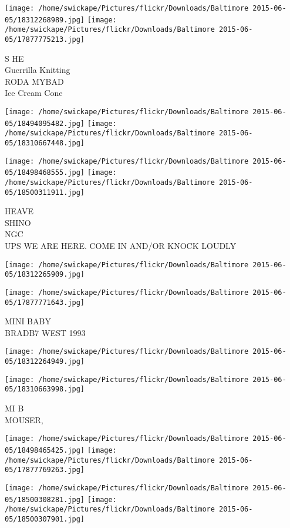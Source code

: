 \documentclass[10pt,letterpaper]{article}
\begin{document}
\texttt{[image: /home/swickape/Pictures/flickr/Downloads/Baltimore 2015-06-05/18312268989.jpg]}
\texttt{[image: /home/swickape/Pictures/flickr/Downloads/Baltimore 2015-06-05/17877775213.jpg]}

S HE\\
Guerrilla Knitting\\
RODA MYBAD\\
Ice Cream Cone
\pagebreak

\texttt{[image: /home/swickape/Pictures/flickr/Downloads/Baltimore 2015-06-05/18494095482.jpg]}
\texttt{[image: /home/swickape/Pictures/flickr/Downloads/Baltimore 2015-06-05/18310667448.jpg]}

\texttt{[image: /home/swickape/Pictures/flickr/Downloads/Baltimore 2015-06-05/18498468555.jpg]}
\texttt{[image: /home/swickape/Pictures/flickr/Downloads/Baltimore 2015-06-05/18500311911.jpg]}

HEAVE\\
SHINO\\
NGC\\
UPS WE ARE HERE.  COME IN AND/OR KNOCK LOUDLY
\pagebreak

\texttt{[image: /home/swickape/Pictures/flickr/Downloads/Baltimore 2015-06-05/18312265909.jpg]}

\vspace{0.25in}
\texttt{[image: /home/swickape/Pictures/flickr/Downloads/Baltimore 2015-06-05/17877771643.jpg]}

MINI BABY\\
BRADB7 WEST 1993
\pagebreak

\texttt{[image: /home/swickape/Pictures/flickr/Downloads/Baltimore 2015-06-05/18312264949.jpg]}

\vspace{0.25in}
\texttt{[image: /home/swickape/Pictures/flickr/Downloads/Baltimore 2015-06-05/18310663998.jpg]}

MI B\\
MOUSER,
\pagebreak

\texttt{[image: /home/swickape/Pictures/flickr/Downloads/Baltimore 2015-06-05/18498465425.jpg]}
\texttt{[image: /home/swickape/Pictures/flickr/Downloads/Baltimore 2015-06-05/17877769263.jpg]}

\texttt{[image: /home/swickape/Pictures/flickr/Downloads/Baltimore 2015-06-05/18500308281.jpg]}
\texttt{[image: /home/swickape/Pictures/flickr/Downloads/Baltimore 2015-06-05/18500307901.jpg]}
\end{document}
